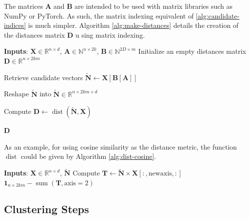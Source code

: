 \documentclass{article}
\newcommand{\bNt}{\widetilde{\mathbf{N}}}
\newcommand{\bX}{\mathbf{X}}
\newcommand{\bA}{\mathbf{A}}
\newcommand{\bB}{\mathbf{B}}
\newcommand{\bD}{\mathbf{D}}
\newcommand{\Real}{\mathbb{R}}
\newcommand{\Nat}{\mathbb{N}}
\newcommand{\bXIn}{\bX \in \Real^{n \times d}}
\newcommand{\bAIn}{\bA \in \Nat^{n \times 2k}}
\newcommand{\bBIn}{\bB \in \Nat^{2D \times m}}
\begin{document}
The matrices $\bA$ and $\bB$ are intended to be used with matrix libraries such as NumPy or PyTorch. As such, the matrix indexing equivalent of \ref{alg:candidate-indices} is much simpler. Algorithm \ref{alg:make-distances} details the creation of the distances matrix $\bD$ u    sing matrix indexing.

\begin{algorithm}[H]
    \caption{Creation of the distances matrix $\bD$}
    \label{alg:make-distances}
    \begin{algorithmic}[1]
        \State \textbf{Inputs}: $\bXIn$, $\bAIn$, $\bBIn$
        \State Initialize an empty distances matrix $\bD \in \Real^{n \times 2km}$
    
        \State Retrieve candidate vectors $\bNt \gets \bX\left[ \bB\left[ \bA \right] \right]$ \Comment{$\bNt \in \Real^{n \times 2k \times m \times d}$}
        
        \State Reshape $\bNt$ into $\bNt \in \Real^{n \times 2km \times d}$ 
    
        \State Compute $\bD \gets \operatorname{dist}(\bNt, \bX)$ 
    
        \State \Return $\bD$ 
    \end{algorithmic}
\end{algorithm}

As an example, for using cosine similarity as the distance metric, the function $\operatorname{dist}$ could be given by Algorithm \ref{alg:dist-cosine}.

\begin{algorithm}[H]
	\caption{Implementation of a $\operatorname{dist}$ function to find cosine distances $\bD$}
	\label{alg:dist-cosine}
	\begin{algorithmic}[1]
        \State \textbf{Inputs}: $\bXIn$, $\bNt$ 
        \State Compute $\mathbf{T} \gets \bNt \times \bX[:, \text{newaxis}, :] $ \Comment{$\mathbf{T} \in \Real^{n \times 2km \times d}$} 
        \State \Return $\mathbf{1}_{n \times 2km} - \operatorname{sum}(\mathbf{T}, \text{axis}=2)$ 
	\end{algorithmic}
\end{algorithm}

\subsection{Clustering Steps}
\end{document}
